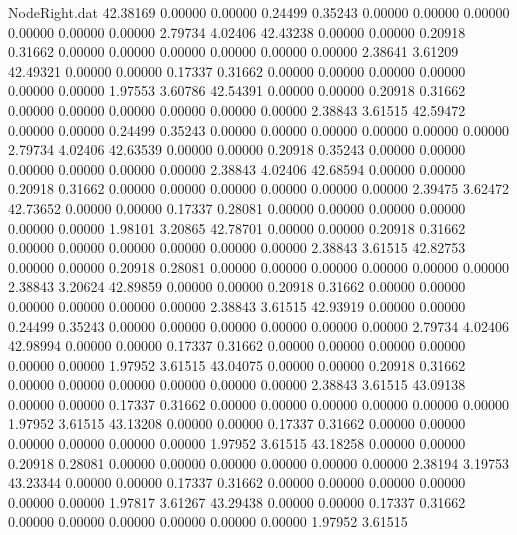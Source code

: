 \begin{filecontents}{NodeRight.dat}
  42.38169    0.00000    0.00000     0.24499    0.35243    0.00000    0.00000    0.00000    0.00000    0.00000    0.00000    2.79734    4.02406
  42.43238    0.00000    0.00000     0.20918    0.31662    0.00000    0.00000    0.00000    0.00000    0.00000    0.00000    2.38641    3.61209
  42.49321    0.00000    0.00000     0.17337    0.31662    0.00000    0.00000    0.00000    0.00000    0.00000    0.00000    1.97553    3.60786
  42.54391    0.00000    0.00000     0.20918    0.31662    0.00000    0.00000    0.00000    0.00000    0.00000    0.00000    2.38843    3.61515
  42.59472    0.00000    0.00000     0.24499    0.35243    0.00000    0.00000    0.00000    0.00000    0.00000    0.00000    2.79734    4.02406
  42.63539    0.00000    0.00000     0.20918    0.35243    0.00000    0.00000    0.00000    0.00000    0.00000    0.00000    2.38843    4.02406
  42.68594    0.00000    0.00000     0.20918    0.31662    0.00000    0.00000    0.00000    0.00000    0.00000    0.00000    2.39475    3.62472
  42.73652    0.00000    0.00000     0.17337    0.28081    0.00000    0.00000    0.00000    0.00000    0.00000    0.00000    1.98101    3.20865
  42.78701    0.00000    0.00000     0.20918    0.31662    0.00000    0.00000    0.00000    0.00000    0.00000    0.00000    2.38843    3.61515
  42.82753    0.00000    0.00000     0.20918    0.28081    0.00000    0.00000    0.00000    0.00000    0.00000    0.00000    2.38843    3.20624
  42.89859    0.00000    0.00000     0.20918    0.31662    0.00000    0.00000    0.00000    0.00000    0.00000    0.00000    2.38843    3.61515
  42.93919    0.00000    0.00000     0.24499    0.35243    0.00000    0.00000    0.00000    0.00000    0.00000    0.00000    2.79734    4.02406
  42.98994    0.00000    0.00000     0.17337    0.31662    0.00000    0.00000    0.00000    0.00000    0.00000    0.00000    1.97952    3.61515
  43.04075    0.00000    0.00000     0.20918    0.31662    0.00000    0.00000    0.00000    0.00000    0.00000    0.00000    2.38843    3.61515
  43.09138    0.00000    0.00000     0.17337    0.31662    0.00000    0.00000    0.00000    0.00000    0.00000    0.00000    1.97952    3.61515
  43.13208    0.00000    0.00000     0.17337    0.31662    0.00000    0.00000    0.00000    0.00000    0.00000    0.00000    1.97952    3.61515
  43.18258    0.00000    0.00000     0.20918    0.28081    0.00000    0.00000    0.00000    0.00000    0.00000    0.00000    2.38194    3.19753
  43.23344    0.00000    0.00000     0.17337    0.31662    0.00000    0.00000    0.00000    0.00000    0.00000    0.00000    1.97817    3.61267
  43.29438    0.00000    0.00000     0.17337    0.31662    0.00000    0.00000    0.00000    0.00000    0.00000    0.00000    1.97952    3.61515

\end{filecontents}

